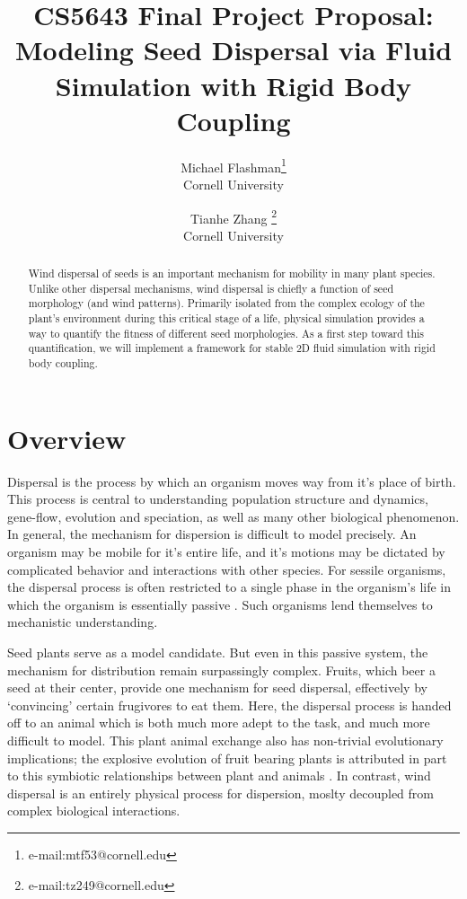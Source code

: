 \documentclass[annual]{acmsiggraph}
\title{CS5643 Final Project Proposal: \\ Modeling Seed Dispersal via Fluid Simulation with Rigid Body Coupling}
\author{Michael Flashman\thanks{e-mail:mtf53@cornell.edu}\\Cornell University \and Tianhe Zhang \thanks{e-mail:tz249@cornell.edu}\\Cornell University}
\begin{document}
\maketitle

\begin{abstract}
Wind dispersal of  seeds is an important mechanism for mobility in many plant species.  Unlike other dispersal mechanisms, wind dispersal is chiefly a function of seed morphology (and wind patterns).  Primarily isolated from the  complex ecology of the plant's environment during this critical stage of a life, physical simulation provides a way to  quantify the fitness of different seed morphologies.   As a first step toward this quantification, we will implement a  framework for stable 2D fluid simulation with rigid body coupling.
\end{abstract}

\keywordlist

\copyrightspace

\section{Overview}


Dispersal is the process by which an organism moves way from it's place of birth.  This process is central to understanding  population structure and dynamics, gene-flow, evolution and speciation, as well as many other biological phenomenon\cite{levin1989}.   In general, the mechanism for dispersion is difficult to model precisely. An organism may be mobile for it's entire life, and it's motions may be dictated by complicated behavior and interactions with other species.  For sessile organisms, the dispersal process is often restricted to a single phase in the organism's life in which the organism is essentially passive \cite{nathan2000}.   Such organisms lend themselves to mechanistic understanding.  

Seed plants serve as a model candidate. But even in this passive system, the mechanism for distribution remain surpassingly complex.  Fruits, which beer a seed at their center, provide one mechanism for seed dispersal, effectively by `convincing' certain frugivores  to eat them. Here, the dispersal process is handed off to an animal which is both much more adept to the task, and much more difficult to model. This plant animal exchange also has non-trivial evolutionary implications; the explosive evolution of fruit bearing plants is  attributed in part to this symbiotic relationships between plant and animals \cite{lorts2008}.  In contrast, wind dispersal is an entirely physical process for dispersion, moslty decoupled from complex biological interactions.    
\end{document}
